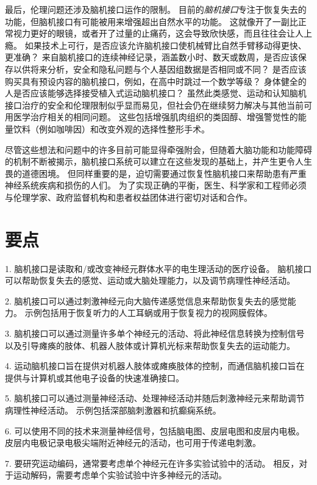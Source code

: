 最后，伦理问题还涉及脑机接口运作的限制。
目前的\textit{脑机接口}专注于恢复失去的功能，但脑机接口有可能被用来增强超出自然水平的功能。
这就像开了一副比正常视力更好的眼镜，或者开了过量的止痛药，这会导致欣快感，而且往往会让人上瘾。
如果技术上可行，是否应该允许脑机接口使机械臂比自然手臂移动得更快、更准确？
来自脑机接口的连续神经记录，涵盖数小时、数天或数周，是否应该保存以供将来分析，安全和隐私问题与个人基因组数据是否相同或不同？
是否应该购买具有预设内容的脑机接口，例如，在高中时跳过一个数学等级？
身体健全的人是否应该能够选择接受植入式运动脑机接口？
虽然此类感觉、运动和认知脑机接口治疗的安全和伦理限制似乎显而易见，但社会仍在继续努力解决与其他当前可用医学治疗相关的相同问题。
这些包括增强肌肉组织的类固醇、增强警觉性的能量饮料（例如咖啡因）和改变外观的选择性整形手术。


尽管这些想法和问题中的许多目前可能显得牵强附会，但随着大脑功能和功能障碍的机制不断被揭示，脑机接口系统可以建立在这些发现的基础上，并产生更令人生畏的道德困境。
但同样重要的是，迫切需要通过恢复性脑机接口来帮助患有严重神经系统疾病和损伤的人们。
为了实现正确的平衡，医生、科学家和工程师必须与伦理学家、政府监督机构和患者权益团体进行密切对话和合作。



\section{要点}

1. 脑机接口是读取和/或改变神经元群体水平的电生理活动的医疗设备。
脑机接口可以帮助恢复失去的感觉、运动或大脑处理能力，以及调节病理性神经活动。


2. 脑机接口可以通过刺激神经元向大脑传递感觉信息来帮助恢复失去的感觉能力。
示例包括用于恢复听力的人工耳蜗或用于恢复视力的视网膜假体。


3. 脑机接口可以通过测量许多单个神经元的活动、将此神经信息转换为控制信号以及引导瘫痪的肢体、机器人肢体或计算机光标来帮助恢复失去的运动能力。


4. 运动脑机接口旨在提供对机器人肢体或瘫痪肢体的控制，而通信脑机接口旨在提供与计算机或其他电子设备的快速准确接口。


5. 脑机接口可以通过测量神经活动、处理神经活动并随后刺激神经元来帮助调节病理性神经活动。
示例包括深部脑刺激器和抗癫痫系统。


6. 可以使用不同的技术来测量神经信号，包括脑电图、皮层电图和皮层内电极。
皮层内电极记录电极尖端附近神经元的活动，也可用于传递电刺激。


7. 要研究运动编码，通常要考虑单个神经元在许多实验试验中的活动。
相反，对于运动解码，需要考虑单个实验试验中许多神经元的活动。


